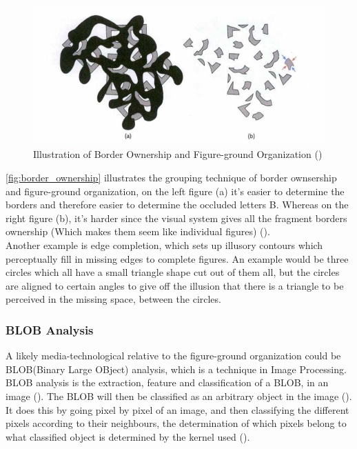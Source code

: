 \documentclass{article}
\newcommand{\goodcite}[1]{ {(\cite{#1})}}
\begin{document}
\begin{figure}[H]
    \centering
    \includegraphics[width=\textwidth]{img/b.png}
    \caption{Illustration of Border Ownership and Figure-ground Organization\goodcite{hsp}}
    \label{fig:border_ownership}
\end{figure}

\autoref{fig:border_ownership} illustrates the grouping technique of border ownsership and figure-ground organization, on the left figure (a) it's easier to determine the borders and therefore easier to determine the occluded letters B. Whereas on the right figure (b), it's harder since the visual system gives all the fragment borders ownership (Which makes them seem like individual figures)\goodcite{hsp}.\medskip \\Another example is edge completion, which sets up illusory contours which perceptually fill in missing edges to complete figures. An example would be three circles which all have a small triangle shape cut out of them all, but the circles are aligned to certain angles to give off the illusion that there is a triangle to be perceived in the missing space, between the circles.\\
\subsubsection{BLOB Analysis}
A likely media-technological relative to the figure-ground organization could be BLOB(Binary Large OBject) analysis, which is a technique in Image Processing. BLOB analysis is the extraction, feature and classification of a BLOB, in an image\goodcite{IP}. The BLOB will then be classified as an arbitrary object in the image\goodcite{IP}.\\It does this by going pixel by pixel of an image, and then classifying the different pixels according to their neighbours, the determination of which pixels belong to what classified object is determined by the kernel used\goodcite{IP}.\medskip \\
\end{document}
